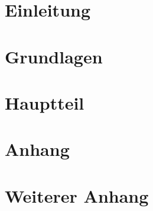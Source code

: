 \documentclass[12pt]{report}
\begin{document}

\newpage


\begin{abstract}
    
\end{abstract}


\tableofcontents
\newpage


\chapter{Einleitung}

\newpage


\chapter{Grundlagen}

\newpage


\chapter{Hauptteil}

\newpage


\begin{thebibliography}{99}
    
\end{thebibliography}
\newpage


\appendix
\chapter{Anhang}

\newpage

\chapter{Weiterer Anhang}

\newpage
\end{document}
